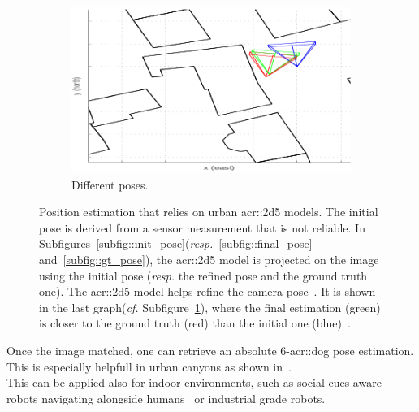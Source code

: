 \begin{figure}[htpb]
\begin{subfigure}{.18\textwidth}
                \end{subfigure}
                \hfill
                \begin{subfigure}{.18\textwidth}
                    \begin{center}
                        \includegraphics[width=\textwidth]{images/introduction/3d_model_applications/pose_estimation/pose_viz}
                        \caption{\label{subfig::viz} Different poses.}
                    \end{center}
                \end{subfigure}
                \caption{
                    \label{fig::navigation} Position estimation that relies on urban \gls{acr::2d5} models.
                    The initial pose is derived from a sensor measurement that is not reliable.
                    In Subfigures~\ref{subfig::init_pose}(\textit{resp.}~\ref{subfig::final_pose} and~\ref{subfig::gt_pose}), the \gls{acr::2d5} model is projected on the image using the initial pose (\textit{resp.} the refined pose and the ground truth one).
                    The \gls{acr::2d5} model helps refine the camera pose~\parencite{armagan2017semantic}.
                    It is shown in the last graph(\textit{cf.} Subfigure~\ref{subfig::viz}), where the final estimation (green) is closer to the ground truth (red) than the initial one (blue)~\parencite{armagan2017semantic}.
                }
            \end{figure}
            Once the image matched, one can retrieve an absolute 6-\gls{acr::dog} pose estimation.
            This is especially helpfull in urban canyons as shown in~\textcite{piasco2018survey}.\\
            This can be applied also for indoor environments, such as social cues aware robots navigating alongside humans~\parencite{gupta2018social} or industrial grade robots\addref.
       

